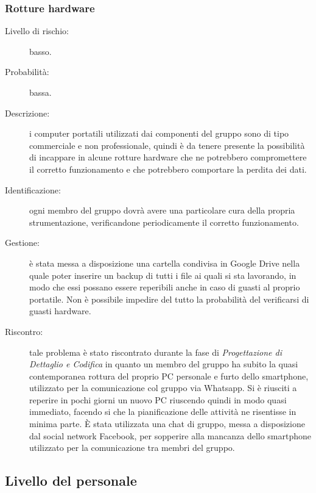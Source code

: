 \subsubsection{Rotture hardware}
\begin{description}
	\item[Livello di rischio:] basso.
	\item[Probabilità:] bassa.
	\item[Descrizione:] i computer portatili utilizzati dai componenti del gruppo sono di tipo commerciale e non professionale, quindi è da tenere presente la possibilità di incappare in alcune rotture hardware che ne potrebbero compromettere il corretto funzionamento e che potrebbero comportare la perdita dei dati.
	\item[Identificazione:] ogni membro del gruppo dovrà avere una particolare cura della propria strumentazione, verificandone periodicamente il corretto funzionamento.
	\item[Gestione:] è stata messa a disposizione una cartella condivisa in \gls{Google Drive} nella quale poter inserire un backup di tutti i file ai quali si sta lavorando, in modo che essi possano essere reperibili anche in caso di guasti al proprio portatile. Non è possibile impedire del tutto la probabilità del verificarsi di guasti hardware.
	\item[Riscontro:] tale problema è stato riscontrato durante la fase di \textit{Progettazione di Dettaglio e Codifica} in quanto un membro del gruppo ha subito la quasi contemporanea rottura del proprio PC personale e furto dello smartphone, utilizzato per la comunicazione col gruppo via \gls{Whatsapp}. Si è riusciti a reperire in pochi giorni un nuovo PC riuscendo quindi in modo quasi immediato, facendo si che la pianificazione delle attività ne risentisse in minima parte. È stata utilizzata una chat di gruppo, messa a disposizione dal social network \gls{Facebook}, per sopperire alla mancanza dello smartphone utilizzato per la comunicazione tra membri del gruppo.  
\end{description}

\subsection{Livello del personale}
